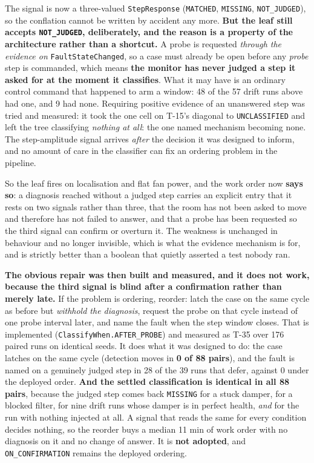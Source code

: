 \begin{itemize}
The signal is now a three-valued \texttt{StepResponse} (\texttt{MATCHED},
\texttt{MISSING}, \texttt{NOT\_JUDGED}), so the conflation cannot be written by accident any
more. \textbf{But the leaf still accepts \texttt{NOT\_JUDGED}, deliberately, and the reason is a
property of the architecture rather than a shortcut.} A probe is requested \emph{through the
evidence on} \texttt{FaultStateChanged}, so a case must already be open before any \emph{probe}
step is commanded, which means \textbf{the monitor has never judged a step it asked for at the
moment it classifies}. What it may have is an ordinary control command that happened to arm a
window: 48 of the 57 drift runs above had one, and 9 had none.
Requiring positive evidence of an unanswered step was tried and measured: it took the one cell on
T-15's diagonal to \texttt{UNCLASSIFIED} and left the tree classifying \emph{nothing at all}:
the one named mechanism becoming none. The step-amplitude signal arrives \emph{after} the decision it was
designed to inform, and no amount of care in the classifier can fix an ordering problem in the
pipeline.

So the leaf fires on localisation and flat fan power, and the work order now \textbf{says so}: a
diagnosis reached without a judged step carries an explicit entry that it rests on two signals
rather than three, that the room has not been asked to move and therefore has not failed to answer,
and that a probe has been requested so the third signal can confirm or overturn it. The weakness is
unchanged in behaviour and no longer invisible, which is what the evidence mechanism is for, and
is strictly better than a boolean that quietly asserted a test nobody ran.

\textbf{The obvious repair was then built and measured, and it does not work, because the third
signal is blind after a confirmation rather than merely late.} If the problem is ordering, reorder:
latch the case on the same cycle as before but \emph{withhold the diagnosis}, request the probe on
that cycle instead of one probe interval later, and name the fault when the step window closes. That
is implemented (\texttt{ClassifyWhen.AFTER\_PROBE}) and measured as T-35 over 176 paired runs on
identical seeds. It does what it was designed to do: the case latches on the same cycle (detection
moves in \textbf{0 of 88 pairs}), and the fault is named on a genuinely judged step in 28 of the 39
runs that defer, against 0 under the deployed order. \textbf{And the settled classification is
identical in all 88 pairs}, because the judged step comes back \texttt{MISSING} for a stuck damper,
for a blocked filter, for nine drift runs whose damper is in perfect health, \emph{and} for the run
with nothing injected at all. A signal that reads the same for every condition decides nothing, so
the reorder buys a median 11 min of work order with no diagnosis on it and no change of answer. It
is \textbf{not adopted}, and \texttt{ON\_CONFIRMATION} remains the deployed ordering.


\end{itemize}
